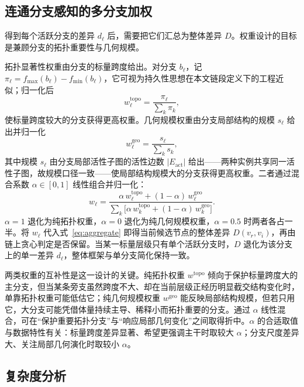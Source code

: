 \documentclass[twocolumn, a4paper, 10pt]{article}
\begin{document}
\subsection{连通分支感知的多分支加权}
\label{sec:weight}

得到每个活跃分支的差异 $d_\ell$ 后，需要把它们汇总为整体差异 $D$。权重设计的目标是兼顾分支的拓扑重要性与几何规模。

拓扑显著性权重由分支的标量跨度给出。对分支 $b_\ell$，记 $\pi_\ell=f_{\max}(b_\ell)-f_{\min}(b_\ell)$，它可视为持久性思想在本文链段定义下的工程近似；归一化后
\begin{equation}
w^{\mathrm{topo}}_\ell=\frac{\pi_\ell}{\sum_{k}\pi_k},
\label{eq:wtopo}
\end{equation}
使标量跨度较大的分支获得更高权重。几何规模权重由分支局部结构的规模 $s_\ell$ 给出并归一化
\begin{equation}
w^{\mathrm{geo}}_\ell=\frac{s_\ell}{\sum_{k}s_k},
\label{eq:wgeo}
\end{equation}
其中规模 $s_\ell$ 由分支局部活性子图的活性边数 $|E_{\mathrm{act}}|$ 给出——两种实例共享同一活性子图，故规模口径一致——使局部结构规模大的分支获得更高权重。二者通过混合系数 $\alpha\in[0,1]$ 线性组合并归一化：
\begin{equation}
w_\ell=\frac{\alpha\,w^{\mathrm{topo}}_\ell+(1-\alpha)\,w^{\mathrm{geo}}_\ell}
{\sum_{k}\bigl[\alpha\,w^{\mathrm{topo}}_k+(1-\alpha)\,w^{\mathrm{geo}}_k\bigr]}.
\label{eq:wmix}
\end{equation}
$\alpha=1$ 退化为纯拓扑权重，$\alpha=0$ 退化为纯几何规模权重，$\alpha=0.5$ 时两者各占一半。将 $w_\ell$ 代入式~\eqref{eq:aggregate} 即得当前候选节点的整体差异 $D(v_r,v_i)$，再由链上贪心判定是否保留。当某一标量层级只有单个活跃分支时，$D$ 退化为该分支上的单一差异 $d_\ell$，整体框架与单分支简化保持一致。

两类权重的互补性是这一设计的关键。纯拓扑权重 $w^{\mathrm{topo}}$ 倾向于保护标量跨度大的主分支，但当某条旁支虽然跨度不大、却在当前层级正经历明显截交结构变化时，单靠拓扑权重可能低估它；纯几何规模权重 $w^{\mathrm{geo}}$ 能反映局部结构规模，但若只用它，大分支可能凭借体量持续主导、稀释小而拓扑重要的分支。通过 $\alpha$ 线性混合，可在“保护重要拓扑分支”与“响应局部几何变化”之间取得折中。$\alpha$ 的合适取值与数据特性有关：标量跨度差异显著、希望更强调主干时取较大 $\alpha$；分支尺度差异大、关注局部几何演化时取较小 $\alpha$。

\subsection{复杂度分析}
\end{document}

